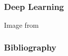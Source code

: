 \documentclass[xetex,professionalfont]{beamer}
\let\oldemph\emph
\renewcommand\emph[1]{\textcolor{tuwcvl_inf_red}{#1}}
\begin{document}

\begin{frame}
\frametitle{Deep Learning}

\begin{center}
    {\centering Image from \cite{bengio2015}}
\end{center}

\end{frame}


\renewcommand\emph[1]{\oldemph{#1}}

\begin{frame}[allowframebreaks=0.9]
\frametitle{Bibliography}

\printbibliography

\end{frame}
\end{document}

